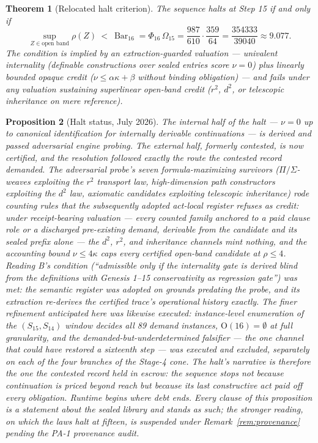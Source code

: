 \documentclass[11pt]{article}
\theoremstyle{plain}
\newtheorem{theorem}{Theorem}[section]
\newtheorem{proposition}[theorem]{Proposition}
\theoremstyle{definition}
\theoremstyle{remark}
\newcommand{\SelBar}{\operatorname{Bar}}
\begin{document}
\begin{theorem}[Relocated halt criterion]
The sequence halts at Step 15 if and only if
\[
\sup_{Z\in\text{open band}}\rho(Z)\ <\ \SelBar_{16}
=\Phi_{16}\,\Omega_{15}
=\frac{987}{610}\cdot\frac{359}{64}
=\frac{354333}{39040}\approx 9.077.
\]
The condition is implied by an extraction-guarded valuation --- univalent internality (definable constructions over sealed entries score \(\nu=0\)) plus linearly bounded opaque credit (\(\nu\le\alpha\kappa+\beta\) without binding obligation) --- and fails under any valuation sustaining superlinear open-band credit (\(r^2\), \(d^2\), or telescopic inheritance on mere reference).
\end{theorem}

\begin{proposition}[Halt status, July 2026]
The internal half of the halt --- \(\nu=0\) up to canonical identification for internally derivable continuations --- is derived and passed adversarial engine probing. The external half, formerly contested, is now certified, and the resolution followed exactly the route the contested record demanded. The adversarial probe's seven formula-maximizing survivors (\(\Pi/\Sigma\)-weaves exploiting the \(r^2\) transport law, high-dimension path constructors exploiting the \(d^2\) law, axiomatic candidates exploiting telescopic inheritance) rode counting rules that the subsequently adopted act-local register refuses as credit: under receipt-bearing valuation --- every counted family anchored to a paid clause role or a discharged pre-existing demand, derivable from the candidate and its sealed prefix alone --- the \(d^2\), \(r^2\), and inheritance channels mint nothing, and the accounting bound \(\nu\le4\kappa\) caps every certified open-band candidate at \(\rho\le4\). Reading B's condition (``admissible only if the internality gate is derived blind from the definitions with Genesis 1--15 conservativity as regression gate'') was met: the semantic register was adopted on grounds predating the probe, and its extraction re-derives the certified trace's operational history exactly. The finer refinement anticipated here was likewise executed: instance-level enumeration of the \((S_{15},S_{14})\) window decides all 89 demand instances, \(\mathrm{O}(16)=\emptyset\) at full granularity, and the demanded-but-underdetermined falsifier --- the one channel that could have restored a sixteenth step --- was executed and excluded, separately on each of the four branches of the Stage-4 cone. The halt's narrative is therefore the one the contested record held in escrow: the sequence stops not because continuation is priced beyond reach but because its last constructive act paid off every obligation. Runtime begins where debt ends. Every clause of this proposition is a statement about the sealed library and stands as such; the stronger reading, on which the laws halt at fifteen, is suspended under Remark~\ref{rem:provenance} pending the PA-1 provenance audit.
\end{proposition}
\end{document}
